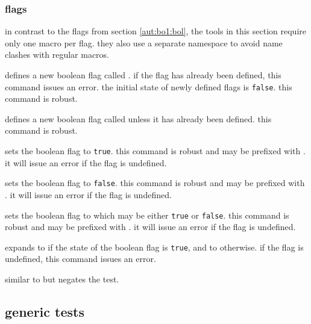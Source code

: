 \subsubsection{\latex flags}
\label{aut:bo1:tgl}

in contrast to the flags from section \ref{aut:bo1:bol}, the tools in this section require only one macro per flag. they also use a separate namespace to avoid name clashes with regular macros.

\begin{ltxsyntax}


defines a new boolean flag called . if the flag has already been defined, this command issues an error. the initial state of newly defined flags is \texttt{false}. this command is robust.


defines a new boolean flag called  unless it has already been defined. this command is robust.


sets the boolean flag  to \texttt{true}. this command is robust and may be prefixed with . it will issue an error if the flag is undefined.


sets the boolean flag  to \texttt{false}. this command is robust and may be prefixed with . it will issue an error if the flag is undefined.


sets the boolean flag  to  which may be either \texttt{true} or \texttt{false}. this command is robust and may be prefixed with . it will issue an error if the flag is undefined.


expands to  if the state of the boolean flag  is \texttt{true}, and to  otherwise. if the flag is undefined, this command issues an error.


similar to  but negates the test.

\end{ltxsyntax}

\subsection{generic tests}
\label{aut:tst}

